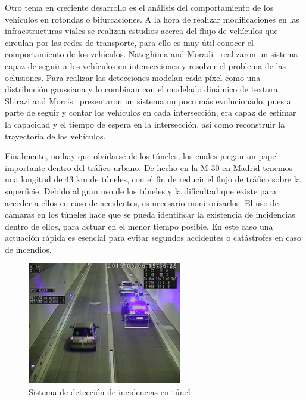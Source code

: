 Otro tema en creciente desarrollo es el análisis del comportamiento de los vehículos en rotondas o bifurcaciones. A la hora de realizar modificaciones en las infraestructuras viales se realizan estudios acerca del flujo de vehículos que circulan por las redes de transporte, para ello es muy útil conocer el comportamiento de los vehículos. Nateghinia and Moradi~\cite{video_based_multiple} realizaron un sistema capaz de seguir a los vehículos en intersecciones y resolver el problema de las oclusiones. Para realizar las detecciones modelan cada píxel como una distribución gaussiana y lo combinan con el modelado dinámico de  textura. Shirazi and Morris~\cite{vision_based_turning} presentaron un sistema un poco más evolucionado, pues a parte de seguir y contar los vehículos en cada intersección, era capaz de estimar la capacidad y el tiempo de espera en la intersección, asi como reconstruir la trayectoria de los vehículos.

Finalmente, no hay que olvidarse de los túneles, los cuales juegan un papel importante dentro del tráfico urbano. De hecho en la M-30 en Madrid tenemos una longitud de 43 km de túneles, con el fin de reducir el flujo de tráfico sobre la superficie. Debido al gran uso de los túneles y la dificultad que existe para acceder a ellos en caso de accidentes, es necesario monitorizarlos. El uso de cámaras en los túneles hace que se pueda identificar la existencia de incidencias dentro de ellos, para actuar en el menor tiempo posible. En este caso una actuación rápida es esencial para evitar segundos accidentes o catástrofes en caso de incendios.

\begin{figure}[H]
  \begin{center}
    \includegraphics[width=0.6\textwidth]{figures/Introduccion/detection_tunel.png}
		\caption{Sistema de detección de incidencias en túnel}
		\label{fig.deteccion_tunel}
		\end{center}
\end{figure}


